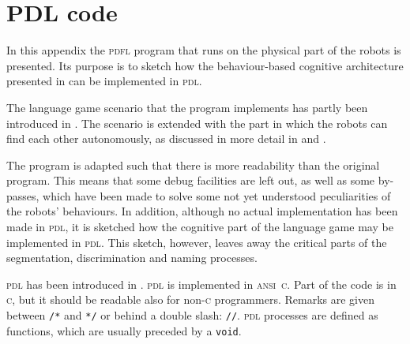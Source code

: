 \chapter{PDL code}\label{a:pdl}

In this appendix the {\scshape pdfl} program that runs on the physical part of the robots is presented. Its purpose is to sketch how the behaviour-based cognitive architecture presented in  can be implemented in {\scshape pdl}.

The language game scenario that the program implements has partly been introduced in . The scenario is extended with the part in which the robots can find each other autonomously, as discussed in more detail in \citet{steelsvogt:1997} and \citet{vogt:1997}.


The program is adapted such that there is more readability than the original program. This means that some debug facilities are left out, as well as some by-passes, which have been made to solve some not yet understood peculiarities of the robots' behaviours. In addition, although no actual implementation has been made in {\scshape pdl}, it is sketched how the cognitive part of the language game may be implemented in {\scshape pdl}. This sketch, however, leaves away the critical parts of the segmentation, discrimination and naming processes.


{\scshape pdl} has been introduced in . {\scshape pdl} is implemented in {\scshape ansi~c}. Part of the code is in {\scshape c}, but it should be readable also for non-{\scshape c} programmers. Remarks are given between \texttt{/*} and \texttt{*/} or behind a double slash: \texttt{//}. {\scshape pdl} processes are defined as functions, which are usually preceded by a \texttt{void}.

